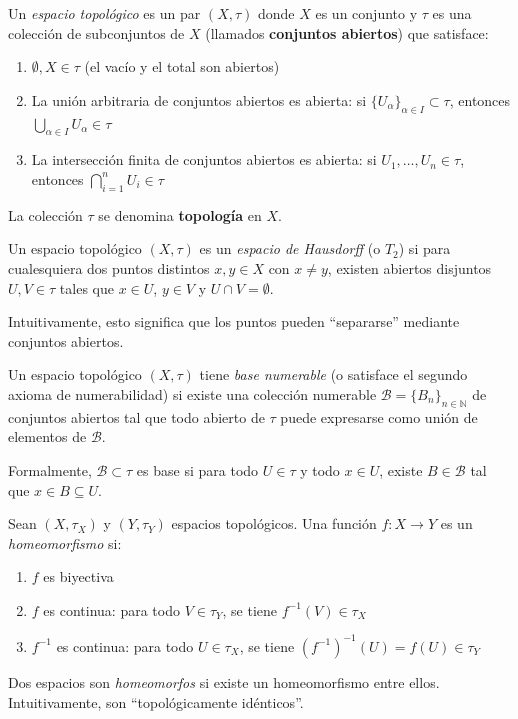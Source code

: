 \begin{definition}\label{def:espacio_topologico}
Un \textit{espacio topológico} es un par $(X, \tau)$ donde $X$ es un conjunto y $\tau$ es una colección de subconjuntos de $X$ (llamados \textbf{conjuntos abiertos}) que satisface:
\begin{enumerate}
	\item $\emptyset, X \in \tau$ (el vacío y el total son abiertos)
	\item La unión arbitraria de conjuntos abiertos es abierta: si $\{U_\alpha\}_{\alpha \in I} \subset \tau$, entonces $\bigcup_{\alpha \in I} U_\alpha \in \tau$
	\item La intersección finita de conjuntos abiertos es abierta: si $U_1, \ldots, U_n \in \tau$, entonces $\bigcap_{i=1}^n U_i \in \tau$
\end{enumerate}
La colección $\tau$ se denomina \textbf{topología} en $X$.
\end{definition}

\begin{definition}\label{def:espacio_hausdorff}
Un espacio topológico $(X, \tau)$ es un \textit{espacio de Hausdorff} (o $T_2$) si para cualesquiera dos puntos distintos $x, y \in X$ con $x \neq y$, existen abiertos disjuntos $U, V \in \tau$ tales que $x \in U$, $y \in V$ y $U \cap V = \emptyset$.

Intuitivamente, esto significa que los puntos pueden ``separarse'' mediante conjuntos abiertos.
\end{definition}

\begin{definition}\label{def:base_numerable}
Un espacio topológico $(X, \tau)$ tiene \textit{base numerable} (o satisface el segundo axioma de numerabilidad) si existe una colección numerable $\mathcal{B} = \{B_n\}_{n \in \mathbb{N}}$ de conjuntos abiertos tal que todo abierto de $\tau$ puede expresarse como unión de elementos de $\mathcal{B}$.

Formalmente, $\mathcal{B} \subset \tau$ es base si para todo $U \in \tau$ y todo $x \in U$, existe $B \in \mathcal{B}$ tal que $x \in B \subseteq U$.
\end{definition}

\begin{definition}[Homeomorfismo]\label{def:homeomorfismo}
Sean $(X, \tau_X)$ y $(Y, \tau_Y)$ espacios topológicos. Una función $f: X \to Y$ es un \textit{homeomorfismo} si:
\begin{enumerate}
	\item $f$ es biyectiva
	\item $f$ es continua: para todo $V \in \tau_Y$, se tiene $f^{-1}(V) \in \tau_X$
	\item $f^{-1}$ es continua: para todo $U \in \tau_X$, se tiene $(f^{-1})^{-1}(U) = f(U) \in \tau_Y$
\end{enumerate}
Dos espacios son \textit{homeomorfos} si existe un homeomorfismo entre ellos. Intuitivamente, son ``topológicamente idénticos''.
\end{definition}

